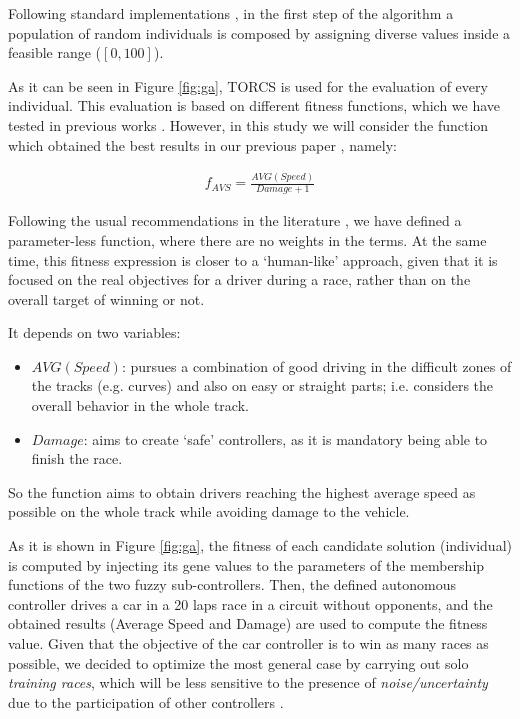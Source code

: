 \documentclass[10pt,journal,compsoc]{IEEEtran}
\begin{document}
Following standard implementations \cite{GAs_Goldberg89}, in the first step of the algorithm \cite{salem_evo17} a population of random individuals is composed by assigning diverse values inside a feasible range ($[0,100]$).

As it can be seen in Figure \ref{fig:ga}, TORCS is used for the evaluation of every individual. This evaluation is based on different fitness functions, which we have tested in previous works \cite{salem_evo18}. 
However, in this study we will consider the function which obtained the best results in our previous paper \cite{salem_cig2018}, namely:

 \begin{equation} \label{fit2}
 	\begin{array}{lll}
 		f_{AVS}= \frac{AVG(Speed)}{Damage+1}
 	\end{array}
 \end{equation}	

Following the usual recommendations in the literature \cite{Harik-ParameterLess99}, we have defined a parameter-less function, where there are no weights in the terms.
At the same time, this fitness expression is closer to a `human-like' approach, given that it is focused on the real objectives for a driver during a race, rather than on the overall target of winning or not. 

It depends on two variables:

 \begin{itemize}
 	\item $AVG(Speed)$: pursues a combination of good driving in the difficult zones of the tracks (e.g. curves) and also on easy or straight parts; i.e. considers the overall behavior in the whole track.
 	\item $Damage$: aims to create `safe' controllers, as it is mandatory being able to finish the race.
 \end{itemize} 

So the function aims to obtain drivers reaching the highest average speed as possible on the whole track while avoiding damage to the vehicle.

As it is shown in Figure \ref{fig:ga}, the fitness of each candidate solution (individual) is computed by injecting its gene values to the parameters of the membership functions of the two fuzzy sub-controllers. Then, the defined autonomous controller drives a car in a 20 laps race in a circuit without opponents, and the obtained results (Average Speed and Damage) are used to compute the fitness value. 
Given that the objective of the car controller is to win as many races as
possible, we decided to optimize the most general case by carrying out solo {\em training races}, which will be less sensitive to the presence of \textit{noise/uncertainty} due to the participation of other controllers \cite{merelo2016statistical}.
\end{document}
